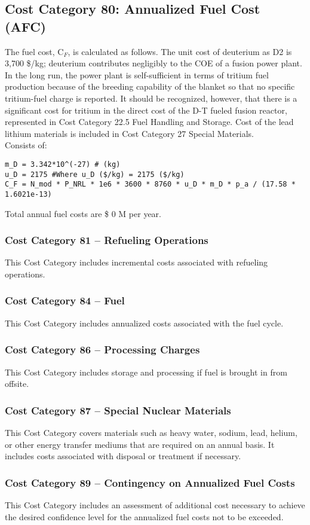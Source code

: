 \subsection{Cost Category 80: Annualized Fuel Cost (AFC)}

The fuel cost, C$_{F}$, is calculated as follows.  The unit cost of deuterium as D2 is 3,700 \$/kg; deuterium contributes negligibly to the COE of a fusion power plant. In the long run, the power plant is self-sufficient in terms of tritium fuel production because of the breeding capability of the blanket so that no specific tritium-fuel charge is reported. It should be recognized, however, that there is a significant cost for tritium in the direct cost of the D-T fueled fusion reactor, represented in Cost Category 22.5 Fuel Handling and Storage. Cost of the lead lithium materials is included in Cost Category 27 Special Materials.\\

Consists of:  
\begin{verbatim} 
m_D = 3.342*10^(-27) # (kg)
u_D = 2175 #Where u_D ($/kg) = 2175 ($/kg) 
C_F = N_mod * P_NRL * 1e6 * 3600 * 8760 * u_D * m_D * p_a / (17.58 * 1.6021e-13)
\end{verbatim} 

Total annual fuel costs are \$ 0 M per year.

\subsubsection*{Cost Category 81 – Refueling Operations}
This Cost Category includes incremental costs associated with refueling operations.

\subsubsection*{Cost Category 84 – Fuel}
This Cost Category includes annualized costs associated with the fuel cycle.

\subsubsection*{Cost Category 86 – Processing Charges}
This Cost Category includes storage and processing if fuel is brought in from offsite.

\subsubsection*{Cost Category 87 – Special Nuclear Materials}
This Cost Category covers materials such as heavy water, sodium, lead, helium, or other energy transfer mediums that are required on an annual basis. It includes costs associated with disposal or treatment if necessary. 

\subsubsection*{Cost Category 89 – Contingency on Annualized Fuel Costs}
This Cost Category includes an assessment of additional cost necessary to achieve the desired confidence level for the annualized fuel costs not to be exceeded.
